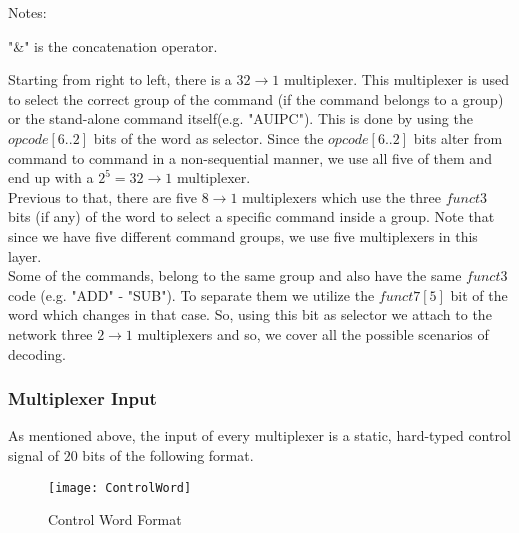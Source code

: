 \begin{threeparttable}[h!]
 		\begin{tablenotes}
 		\footnotesize
 		\item 
 		Notes:
 		\item 	
 		"\&" is the concatenation operator.
 		\end{tablenotes}
 		
 		\label{Table 3.1}
 		\vspace{5mm}
 		
 	\end{threeparttable}
 
 	\clearpage
	 	 
	 Starting from right to left, there is a $32\rightarrow1$ multiplexer. This multiplexer is used to select the correct group of the command (if the command belongs to a group) or the stand-alone command itself(e.g. "AUIPC"). This is done by using the $opcode[6..2]$ bits of the word as selector. Since the $opcode[6..2]$ bits alter from command to command in a non-sequential manner, we use all five of them and end up with a $2^{5}=32\rightarrow1$ multiplexer.\\
	 
	 Previous to that, there are five $8\rightarrow1$ multiplexers which use the three $funct3$ bits (if any) of the word to select a specific command inside a group. Note that since we have five different command groups, we use five multiplexers in this layer.\\
	 
	 Some of the commands, belong to the same group and also have the same $funct3$ code (e.g. "ADD" - "SUB"). To separate them we utilize the $funct7[5]$ bit of the word which changes in that case. So, using this bit as selector we attach to the network three $2\rightarrow1$ multiplexers and so, we cover all the possible scenarios of decoding.\\
	 
	
	\subsubsection{Multiplexer Input}
	\label{SubSubSec3.2.2.1: MUX INPUT}
	
	As mentioned above, the input of every multiplexer is a static, hard-typed control signal of $20$ bits of the following format. \\
	
	\begin{figure}[h!]
		\begin{center}
			\texttt{[image: ControlWord]}
			\caption{Control Word Format}
			\label{Image3.3}
		\end{center}
	\end{figure}	

